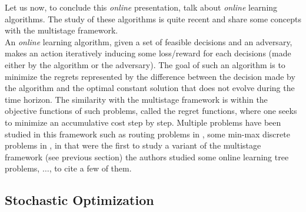 \documentclass[a4paper]{book}
\begin{document}
Let us now, to conclude this \emph{online} presentation, talk about \emph{online} learning algorithms. The study of these algorithms is quite recent and share some concepts with the multistage framework. \\
An \emph{online} learning algorithm, given a set of feasible decisions and an adversary, makes an action iteratively inducing some loss/reward for each decisions (made either by the algorithm or the adversary). The goal of such an algorithm is to minimize the regrets represented by the difference between the decision made by the algorithm and the optimal constant solution that does not evolve during the time horizon. The similarity with the multistage framework is within the objective functions of such problems, called the regret functions, where one seeks to minimize an accumulative cost step by step. Multiple problems have been studied in this framework such as routing problems in \cite{AwerbuchK08}, some min-max discrete problems in \cite{corr/abs-1907-05944}, in \cite{buchbinder2012unified} that were the first to study a variant of the multistage framework (see previous section) the authors studied some online learning tree problems, $\ldots$, to cite a few of them.




\subsection{Stochastic Optimization}
\end{document}

